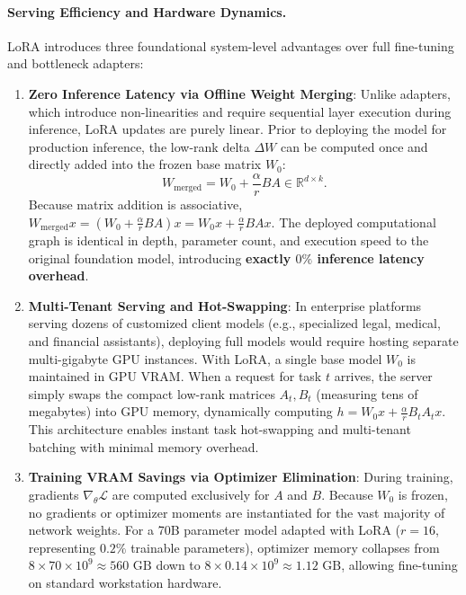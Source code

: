 \documentclass[../../../main.tex]{subfiles}
\begin{document}
\paragraph{Serving Efficiency and Hardware Dynamics.}
LoRA introduces three foundational system-level advantages over full fine-tuning and bottleneck adapters:
\begin{enumerate}
    \item \textbf{Zero Inference Latency via Offline Weight Merging}: Unlike adapters, which introduce non-linearities and require sequential layer execution during inference, LoRA updates are purely linear. Prior to deploying the model for production inference, the low-rank delta $\Delta W$ can be computed once and directly added into the frozen base matrix $W_0$:
    \begin{equation}
    \label{eq:lora_weight_merging}
    W_{\text{merged}} = W_0 + \frac{\alpha}{r} B A \in \mathbb{R}^{d \times k}.
    \end{equation}
    Because matrix addition is associative, $W_{\text{merged}} x = (W_0 + \frac{\alpha}{r} B A) x = W_0 x + \frac{\alpha}{r} B A x$. The deployed computational graph is identical in depth, parameter count, and execution speed to the original foundation model, introducing \textbf{exactly $0\%$ inference latency overhead}.
    \item \textbf{Multi-Tenant Serving and Hot-Swapping}: In enterprise platforms serving dozens of customized client models (e.g., specialized legal, medical, and financial assistants), deploying full models would require hosting separate multi-gigabyte GPU instances. With LoRA, a single base model $W_0$ is maintained in GPU VRAM. When a request for task $t$ arrives, the server simply swaps the compact low-rank matrices $A_t, B_t$ (measuring tens of megabytes) into GPU memory, dynamically computing $h = W_0 x + \frac{\alpha}{r} B_t A_t x$. This architecture enables instant task hot-swapping and multi-tenant batching with minimal memory overhead.
    \item \textbf{Training VRAM Savings via Optimizer Elimination}: During training, gradients $\nabla_\theta \mathcal{L}$ are computed exclusively for $A$ and $B$. Because $W_0$ is frozen, no gradients or optimizer moments are instantiated for the vast majority of network weights. For a 70B parameter model adapted with LoRA ($r=16$, representing $0.2\%$ trainable parameters), optimizer memory collapses from $8 \times 70 \times 10^9 \approx 560\text{ GB}$ down to $8 \times 0.14 \times 10^9 \approx 1.12\text{ GB}$, allowing fine-tuning on standard workstation hardware.
\end{enumerate}
\end{document}
